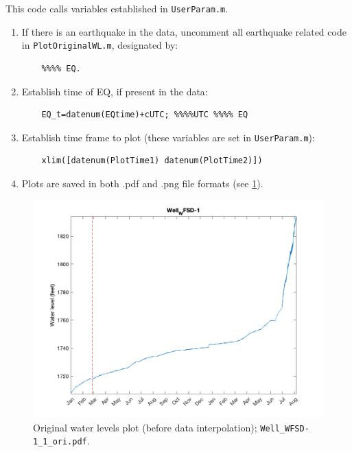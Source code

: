 \documentclass[11pt]{article}
\begin{document}
This code calls variables established in \texttt{UserParam.m}.

\begin{enumerate}
    \item If there is an earthquake in the data, uncomment all earthquake
        related code in \texttt{PlotOriginalWL.m}, designated by:
\begin{verbatim}
    %%%% EQ.
\end{verbatim}

\item Establish time of EQ, if present in the data:
\begin{verbatim}
    EQ_t=datenum(EQtime)+cUTC; %%%%UTC %%%% EQ
\end{verbatim}

\item Establish time frame to plot (these variables are set in \texttt{UserParam.m}):
\begin{verbatim}
    xlim([datenum(PlotTime1) datenum(PlotTime2)])
\end{verbatim}

\item Plots are saved in both .pdf and .png file formats (see \ref{fig:origWLplot}).

\end{enumerate}


\begin{figure}[h]
    \centering
    \includegraphics[width=1.0\textwidth]{../Well_WFSD-1_1_ori.png}
    \caption{Original water levels plot (before data interpolation);
    \texttt{Well\_WFSD-1\_1\_ori.pdf}.}
    \label{fig:origWLplot}
\end{figure}
\end{document}
